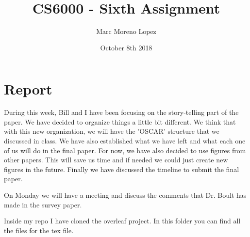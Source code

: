 \documentclass{article}
\title{CS6000 - Sixth Assignment}
\author{Marc Moreno Lopez}
\date{October 8th 2018}
\begin{document}
\maketitle

\section{Report}

During this week, Bill and I have been focusing on the story-telling part of the paper. We have decided to organize things a little bit different. We think that with this new organization, we will have the 'OSCAR' structure that we discussed in class. We have also established what we have left and what each one of us will do in the final paper. For now, we have also decided to use figures from other papers. This will save us time and if needed we could just create new figures in the future. Finally we have discussed the timeline to submit the final paper.

On Monday we will have a meeting and discuss the comments that Dr. Boult has made in the survey paper. 

Inside my repo I have cloned the overleaf project. In this folder you can find all the files for the tex file.
\end{document}
